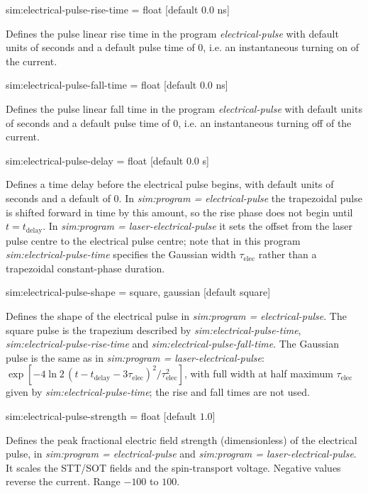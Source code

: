 {\zicf sim:electrical-pulse-rise-time = float [default $0.0$ ns]}
Defines the pulse linear rise time in the program \textit{electrical-pulse} with
 default units of seconds and a default pulse time of 0, i.e. an instantaneous
 turning on of the current.

{\zicf sim:electrical-pulse-fall-time = float [default $0.0$ ns]}
Defines the pulse linear fall time in the program \textit{electrical-pulse} with
 default units of seconds and a default pulse time of 0, i.e. an instantaneous
 turning off of the current.

{\zicf sim:electrical-pulse-delay = float [default $0.0$ s]}
Defines a time delay before the electrical pulse begins, with default units of seconds and a default of 0.
In \textit{sim:program = electrical-pulse} the trapezoidal pulse is shifted forward in time by this amount,
so the rise phase does not begin until $t = t_\mathrm{delay}$.
In \textit{sim:program = laser-electrical-pulse} it sets the offset from the laser pulse centre to the
electrical pulse centre; note that in this program \textit{sim:electrical-pulse-time} specifies the
Gaussian width $\tau_\mathrm{elec}$ rather than a trapezoidal constant-phase duration.

{\zicf sim:electrical-pulse-shape = square, gaussian [default square]}
Defines the shape of the electrical pulse in \textit{sim:program = electrical-pulse}. The square pulse is the
trapezium described by \textit{sim:electrical-pulse-time}, \textit{sim:electrical-pulse-rise-time} and
\textit{sim:electrical-pulse-fall-time}. The Gaussian pulse is the same as in
\textit{sim:program = laser-electrical-pulse}: $\exp[-4\ln 2\,(t - t_\mathrm{delay} - 3\tau_\mathrm{elec})^2/\tau_\mathrm{elec}^2]$,
with full width at half maximum $\tau_\mathrm{elec}$ given by \textit{sim:electrical-pulse-time}; the rise and
fall times are not used.

{\zicf sim:electrical-pulse-strength = float [default $1.0$]}
Defines the peak fractional electric field strength (dimensionless) of the electrical pulse, in
\textit{sim:program = electrical-pulse} and \textit{sim:program = laser-electrical-pulse}. It scales the
STT/SOT fields and the spin-transport voltage. Negative values reverse the current. Range $-100$ to $100$.

